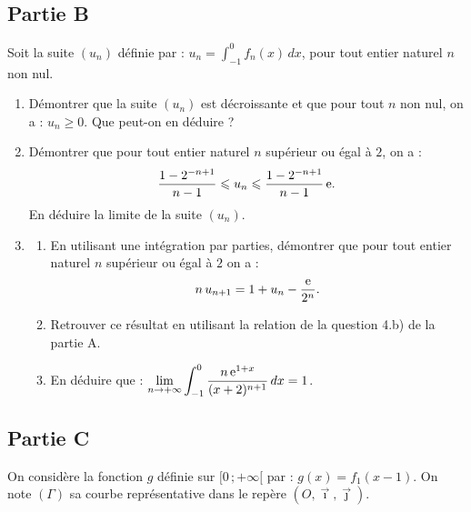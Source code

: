 \subsection*{Partie B}

Soit la suite $(u_n)$ définie par : $\displaystyle u_n = \int_{-1}^0 f_n(x)\,dx$, pour tout entier naturel $n$ non nul.

\begin{enumerate}
	\item Démontrer que la suite $(u_n)$ est décroissante et que pour tout $n$ non nul, on a : $u_n\geqslant0$. Que peut-on en déduire ?
	\item Démontrer que pour tout entier naturel $n$ supérieur ou égal à $2$, on a :
	\[
	\frac{1-2^{-n+1}}{n-1} \leqslant u_n \leqslant \frac{1-2^{-n+1}}{n-1}\,\mathrm{e}.
	\]
	En déduire la limite de la suite $(u_n)$.
	\item
	\begin{enumerate}
		\item En utilisant une intégration par parties, démontrer que pour tout entier naturel $n$ supérieur ou égal à $2$ on a :
		\[
		n\,u_{n+1} = 1+u_n-\frac{\mathrm{e}}{2^n}.
		\]
		\item Retrouver ce résultat en utilisant la relation de la question 4.b) de la partie A.
		\item En déduire que : $\displaystyle\lim_{n\to+\infty} \int_{-1}^0 \frac{n\,\mathrm{e}^{1+x}}{(x+2)^{n+1}}\,dx = 1$.
	\end{enumerate}
\end{enumerate}

\subsection*{Partie C}

On considère la fonction $g$ définie sur $[0\,;+\infty[$ par : $g(x)=f_1(x-1)$. On note $(\Gamma)$ sa courbe représentative dans le repère $(O,\vec{\imath},\vec{\jmath})$.


